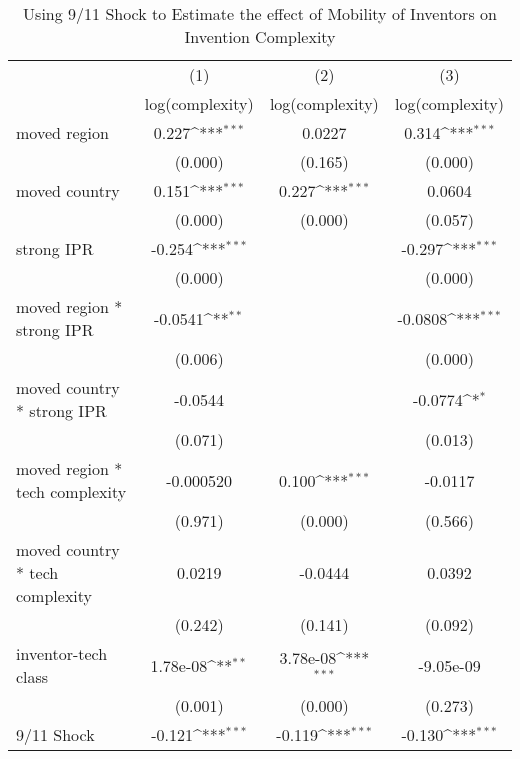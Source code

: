 {
\def\sym#1{\ifmmode^{#1}\else\(^{#1}\)\fi}
\begin{longtable}{l*{3}{c}}
\caption{Using 9/11 Shock to Estimate the effect of Mobility of Inventors on Invention Complexity \label{model7a7b7c}}\\
\hline\hline\endfirsthead\hline\endhead\hline\endfoot\endlastfoot
                &\multicolumn{1}{c}{(1)}&\multicolumn{1}{c}{(2)}&\multicolumn{1}{c}{(3)}\\
                &\multicolumn{1}{c}{log(complexity)}&\multicolumn{1}{c}{log(complexity)}&\multicolumn{1}{c}{log(complexity)}\\
\hline
moved region    &    0.227\sym{***}&   0.0227         &    0.314\sym{***}\\
                &  (0.000)         &  (0.165)         &  (0.000)         \\
moved country   &    0.151\sym{***}&    0.227\sym{***}&   0.0604         \\
                &  (0.000)         &  (0.000)         &  (0.057)         \\
strong IPR      &   -0.254\sym{***}&                  &   -0.297\sym{***}\\
                &  (0.000)         &                  &  (0.000)         \\
moved region * strong IPR&  -0.0541\sym{**} &                  &  -0.0808\sym{***}\\
                &  (0.006)         &                  &  (0.000)         \\
moved country * strong IPR&  -0.0544         &                  &  -0.0774\sym{*}  \\
                &  (0.071)         &                  &  (0.013)         \\
moved region * tech complexity&-0.000520         &    0.100\sym{***}&  -0.0117         \\
                &  (0.971)         &  (0.000)         &  (0.566)         \\
moved country * tech complexity&   0.0219         &  -0.0444         &   0.0392         \\
                &  (0.242)         &  (0.141)         &  (0.092)         \\
inventor-tech class& 1.78e-08\sym{**} & 3.78e-08\sym{***}&-9.05e-09         \\
                &  (0.001)         &  (0.000)         &  (0.273)         \\
9/11 Shock      &   -0.121\sym{***}&   -0.119\sym{***}&   -0.130\sym{***}\\

\end{longtable}}
